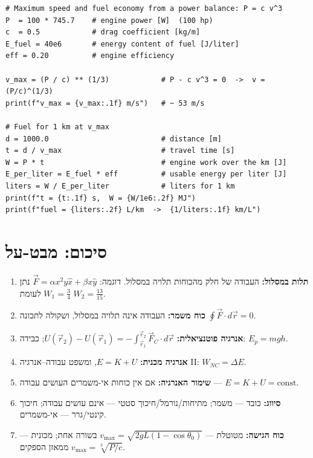 \documentclass[12pt, a4paper]{article}
\newcommand{\hvec}[1]{\overrightarrow{#1}}
\begin{document}
\begin{LTR}
\begin{lstlisting}[style=pycode]
# Maximum speed and fuel economy from a power balance: P = c v^3
P  = 100 * 745.7    # engine power [W]  (100 hp)
c  = 0.5            # drag coefficient [kg/m]
E_fuel = 40e6       # energy content of fuel [J/liter]
eff = 0.20          # engine efficiency

v_max = (P / c) ** (1/3)            # P - c v^3 = 0  ->  v = (P/c)^(1/3)
print(f"v_max = {v_max:.1f} m/s")   # ~ 53 m/s

# Fuel for 1 km at v_max
d = 1000.0                          # distance [m]
t = d / v_max                       # travel time [s]
W = P * t                           # engine work over the km [J]
E_per_liter = E_fuel * eff          # usable energy per liter [J]
liters = W / E_per_liter            # liters for 1 km
print(f"t = {t:.1f} s,  W = {W/1e6:.2f} MJ")
print(f"fuel = {liters:.2f} L/km  ->  {1/liters:.1f} km/L")
\end{lstlisting}
\end{LTR}

\section*{סיכום: מבט-על}

\begin{tcolorbox}[warnbox, title={נקודות מפתח לזכור}]
\begin{enumerate}
  \item \textbf{תלות במסלול:} העבודה של חלק מהכוחות תלויה במסלול. דוגמה: \textenglish{$\hvec{F}=\alpha x^2 y\hat{x}+\beta x\hat{y}$} נתן \textenglish{$W_1=\tfrac{3}{4}$} לעומת \textenglish{$W_2=\tfrac{13}{15}$}.
  \item \textbf{כוח משמר:} העבודה אינה תלויה במסלול, ושקולה לתכונה \textenglish{$\oint \hvec{F}\cdot d\hvec{r} = 0$}.
  \item \textbf{אנרגיה פוטנציאלית:} \textenglish{$U(\hvec{r}_2)-U(\hvec{r}_1) = -\int_{\hvec{r}_1}^{\hvec{r}_2}\hvec{F}_C\cdot d\hvec{r}$}; כבידה: \textenglish{$E_p = mgh$}.
  \item \textbf{אנרגיה מכנית:} \textenglish{$E = K + U$}, ומשפט עבודה--אנרגיה II: \textenglish{$W_{NC} = \Delta E$}.
  \item \textbf{שימור האנרגיה:} אם אין כוחות אי-משמרים העושים עבודה --- \textenglish{$E = K + U = \text{const}$}.
  \item \textbf{סיווג:} כובד --- משמר; מתיחות/נורמל/חיכוך סטטי --- אינם עושים עבודה; חיכוך קינטי/גרר --- אי-משמרים.
  \item \textbf{כוח הגישה:} מטוטלת --- \textenglish{$v_{\max}=\sqrt{2gL(1-\cos\theta_0)}$} בשורה אחת; מכונית --- \textenglish{$v_{\max}=\sqrt[3]{P/c}$} ממאזן הספקים.
\end{enumerate}
\end{tcolorbox}
\end{document}
